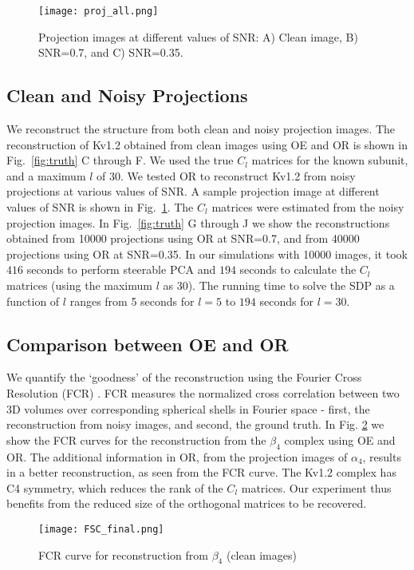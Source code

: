 \documentclass{article}
\begin{document}
\begin{figure}
\centering
  \texttt{[image: proj\_all.png]}
  \caption{Projection images at different values of SNR: A) Clean image, B) SNR=0.7, and
  C) SNR=0.35.}
\label{fig:proj}
\end{figure}

\subsection{Clean and Noisy Projections}
We reconstruct the structure from both clean and noisy projection images. The
reconstruction of Kv1.2 obtained from clean images using OE and OR is shown in
Fig.~\ref{fig:truth} C through F. We used the true $C_l$ matrices for the known subunit, and a maximum
$l$ of 30. We tested OR to reconstruct Kv1.2 from noisy projections at various values of
SNR. A sample projection image at different values of SNR is shown in Fig.~\ref{fig:proj}.
The $C_l$ matrices were estimated from the noisy projection images. In
Fig.~\ref{fig:truth} G through J we show the reconstructions obtained from 10000 projections using OR
at SNR=0.7, and from 40000 projections using OR at SNR=0.35. In our simulations with 10000 images, it took $416$ seconds to perform steerable PCA and $194$ seconds to calculate the $C_l$ matrices (using the maximum $l$ as 30). The running time to solve the SDP as a function of $l$ ranges from 5 seconds for $l=5$ to $194$ seconds for $l=30$.

\subsection{Comparison between OE and OR}
We quantify the `goodness' of the reconstruction using the Fourier Cross Resolution (FCR)
\cite{fcr}. FCR measures the normalized cross correlation between two 3D volumes over
corresponding spherical shells in Fourier space - first, the reconstruction from noisy
images, and second, the ground truth. In Fig. \ref{fig:fsc} we show the FCR curves for the
reconstruction from the $\beta_4$ complex using OE and OR. The additional information in
OR, from the projection images of $\alpha_4$, results in a better reconstruction, as seen
from the FCR curve. The Kv1.2 complex has C4 symmetry, which reduces the rank of the
$C_l$ matrices. Our experiment thus benefits from the reduced size of the orthogonal
matrices to be recovered.

\begin{figure}[t]
  \centering
  \texttt{[image: FSC\_final.png]}
  \caption{FCR curve for reconstruction from $\beta_4$ (clean images)}\label{fig:fsc}
\end{figure}
\end{document}
